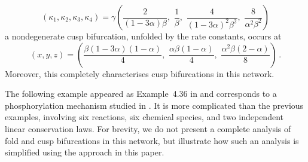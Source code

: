\documentclass[11pt]{amsart}
\renewcommand{\k}{\kappa}
\theoremstyle{definition}
\newenvironment{ex}
  {\pushQED{\qed}\renewcommand{\qedsymbol}{$\Diamond$}\example}
  {\popQED\endexample}
\begin{document}
\begin{ex}
\[
(\k_1,\k_2,\k_3,\k_4) = \gamma\left(\frac{2}{(1-3\alpha)\beta},\,\,\frac{1}{\beta}, \,\,\frac{4}{(1-3\alpha)^2\beta^2}, \,\,\frac{8}{\alpha^2\beta^2}\right)
\]
a nondegenerate cusp bifurcation, unfolded by the rate constants, occurs at 
\[
(x,y,z) = \left(\frac{\beta(1-3\alpha)(1-\alpha)}{4},\,\,\frac{\alpha\beta(1-\alpha)}{4},\,\,\frac{\alpha^2\beta(2-\alpha)}{8}\right)\,.
\]
Moreover, this completely characterises cusp bifurcations in this network. 
\end{ex}

The following example appeared as Example~4.36 in \cite{banajifeliu26} and corresponds to a phosphorylation mechanism  studied in \cite{Kothamachu2015multistability}. It is more complicated than the previous examples, involving six reactions, six chemical species, and two independent linear conservation laws. For brevity, we do not present a complete analysis of fold and cusp bifurcations in this network, but illustrate how such an analysis is simplified using the approach in this paper. 
\end{document}
